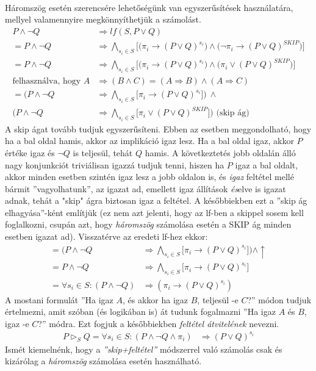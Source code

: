 \documentclass[12pt]{article}
\begin{document}
	\paragraph{}Háromszög esetén szerencsére lehetőségünk van egyszerűsítések használatára, mellyel valamennyire megkönnyíthetjük a számolást.
	\begin{align*}
	P \land \neg Q &\Rightarrow lf(S,P \lor Q) \\
	= P \land \neg Q &\Rightarrow \bigwedge_{s_i \in S} \big[\big(\pi_i \rightarrow (P \lor Q)^{s_i}\big) \land \big(\neg \pi_i \rightarrow (P \lor Q)^{SKIP}\big)\big] \\
	= P \land \neg Q &\Rightarrow \bigwedge_{s_i \in S} \big[\big(\pi_i \rightarrow (P \lor Q)^{s_i}\big) \land \big(\pi_i \lor (P \lor Q)^{SKIP}\big)\big] \\
	\text{felhasználva, hogy } A &\Rightarrow (B \land C) = (A \Rightarrow B) \land (A \Rightarrow C) \\
	= \big(P \land \neg Q &\Rightarrow \bigwedge_{s_i \in S}  \big[\pi_i \rightarrow (P \lor Q)^{s_i}\big]\big)\ \land \\
	\big(P \land \neg Q &\Rightarrow \bigwedge_{s_i \in S} \big[\pi_i \lor (P \lor Q)^{SKIP}\big]\big) \text{ (skip ág)}
	\end{align*}
	A skip ágat tovább tudjuk egyszerűsíteni.
	Ebben az esetben meggondolható, hogy ha a bal oldal hamis, akkor az implikáció igaz lesz. Ha a bal oldal igaz, akkor $P$ értéke igaz és $\neg Q$ is teljesül, tehát $Q$ hamis. A következtetés jobb oldalán álló nagy konjunkciót triviálisan igazzá tudjuk tenni, hiszen ha $P$ igaz a bal oldalt, akkor  minden esetben szintén igaz lesz a jobb oldalon is, és \textit{igaz} feltétel mellé bármit ''vagyolhatunk'', az igazat ad, emellett igaz állítások \textit{és}elve is igazat adnak, tehát a "skip" ágra biztosan igaz a feltétel. A későbbiekben ezt a ''skip ág elhagyása''-ként említjük (ez nem azt jelenti, hogy az lf-ben a skippel sosem kell foglalkozni, csupán azt, hogy \textit{háromszög} számolása esetén a SKIP ág minden esetben igazat ad). Visszatérve az eredeti lf-hez ekkor:
	\begin{align*}
	= \big(P \land \neg Q &\Rightarrow \bigwedge_{s_i \in S} \big[\pi_i \rightarrow (P \lor Q)^{s_i}\big]\big) \land \uparrow \\
	= P \land \neg Q &\Rightarrow \bigwedge_{s_i \in S} \big[\pi_i \rightarrow (P \lor Q)^{s_i}\big] \\
	= \forall s_i \in S: (P \land \neg Q) &\Rightarrow (\pi_i \rightarrow (P \lor Q)^{s_i})
	\end{align*}
	A mostani formulát ''Ha igaz $A$, és akkor ha igaz $B$, teljesül -e $C$?'' módon tudjuk értelmezni, amit szóban (és logikában is) át tudunk fogalmazni ''Ha igaz $A$ és $B$, igaz -e $C$?'' módra. Ezt fogjuk a későbbiekben \textit{feltétel átvitelének} nevezni.
	\begin{align*}
	P \vartriangleright_S Q = \forall s_i \in S: (P \land \neg Q \land \pi_i) &\Rightarrow (P \lor Q)^{s_i}
	\end{align*}
	Ismét kiemelnénk, hogy a \textit{''skip+feltétel''} módszerrel való számolás csak és kizárólag a \textit{háromszög} számolása esetén használható.
	
\end{document}
